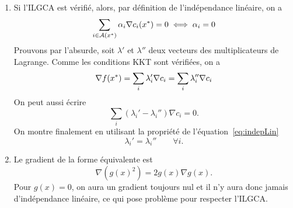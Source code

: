 \begin{enumerate}
  \begin{solution}
    \begin{enumerate}
      \item Si l'ILGCA est vérifié, alors, 
      par définition de l'indépendance linéaire, on a
      \begin{equation} 
        \sum_{i \in \mathcal{A}(x^*)}{\alpha_i \nabla c_i (x^*)} = 0
        \iff \alpha_i = 0 
        \label{eq:indepLin}
      \end{equation}
      Prouvons par l'absurde,
      soit $\lambda'$ et $\lambda''$ deux vecteurs des multiplicateurs de
      Lagrange.
      Comme les conditions KKT sont vérifiées, on a
      \[ 
        \nabla f(x^*) = \sum_i \lambda_i' \nabla c_i = \sum_i \lambda_i'' \nabla c_i
      \]
      On peut aussi écrire 
      \[ \sum_i (\lambda_i' - \lambda_i'') \nabla c_i = 0. \]
      On montre finalement en utilisant la propriété de l'équation~\ref{eq:indepLin}
      \[ \lambda_i' = \lambda_i'' \qquad \forall i. \] 
      
      \item Le gradient de la forme équivalente est
      \[ \nabla (g(x)^2) = 2 g(x) \nabla g(x). \]
      Pour $g(x)=0$, on aura un gradient toujours nul
      et il n'y aura donc jamais d'indépendance linéaire,
      ce qui pose problème pour respecter l'ILGCA.
    \end{enumerate}
  \end{solution}
  
\end{enumerate}